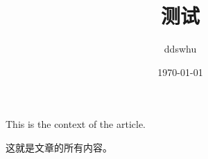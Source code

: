 \documentclass[UTF8]{ctexart}
\title{测试}
\author{ddswhu}
\date{\today}
\begin{document}
\maketitle
 
This is the context of the article.
 
这就是文章的所有内容。
 
\end{document}
